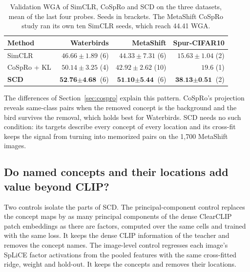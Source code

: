 \documentclass{article}
\begin{document}
\begin{table}[htbp]
\centering\small
\caption{Validation WGA of SimCLR, CoSpRo and SCD on the three datasets, mean of the last four probes. Seeds in brackets. The MetaShift CoSpRo study ran its own ten SimCLR seeds, which reach 44.41 WGA.}
\label{tab:cospro_all}
\begin{tabular}{lrrr}
\toprule
Method & Waterbirds & MetaShift & Spur-CIFAR10 \\
\midrule
SimCLR & $46.66\pm1.89$ (6) & $44.33\pm7.31$ (6) & $15.63\pm1.04$ (2) \\
CoSpRo + KL & $50.14\pm3.25$ (4) & $42.92\pm2.62$ (10) & $19.6$ (1) \\
\textbf{SCD} & $\textbf{52.76}\pm\textbf{4.68}$ (6) & $\textbf{51.10}\pm\textbf{5.44}$ (6) & $\textbf{38.13}\pm\textbf{0.51}$ (2) \\
\bottomrule
\end{tabular}
\end{table}

The differences of Section~\ref{sec:cospro} explain this pattern. CoSpRo's projection reveals same-class pairs when the removed concept is the background and the bird survives the removal, which holds best for Waterbirds. SCD needs no such condition: its targets describe every concept of every location and its cross-fit keeps the signal from turning into memorized pairs on the 1,700 MetaShift images.

\subsection{Do named concepts and their locations add value beyond CLIP?}
Two controls isolate the parts of SCD. The principal-component control replaces the concept maps by as many principal components of the dense ClearCLIP patch embeddings as there are factors, computed over the same cells and trained with the same loss. It keeps the dense CLIP information of the teacher and removes the concept names. The image-level control regresses each image's SpLiCE factor activations from the pooled features with the same cross-fitted ridge, weight and hold-out. It keeps the concepts and removes their locations.
\end{document}
